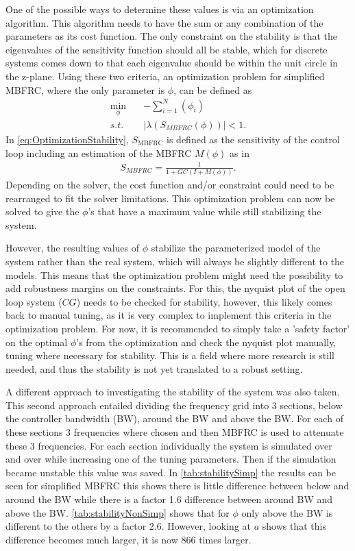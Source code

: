 \documentclass[journal]{IEEEtran}
\begin{document}
One of the possible ways to determine these values is via an optimization algorithm. This algorithm needs to have the sum or any combination of the parameters as its cost function. The only constraint on the stability is that the eigenvalues of the sensitivity function should all be stable, which for discrete systems comes down to that each eigenvalue should be within the unit circle in the z-plane. Using these two criteria, an optimization problem for simplified MBFRC, where the only parameter is $\phi$, can be defined as
\begin{subequations}
\begin{align}\label{eq:OptimizationStability}
    \min_{\phi} \quad & -\sum_{i=1}^{N}(\phi_i )\\
    s.t. \quad & |\lambda(S_{MBFRC}(\phi))|<1.
\end{align}
\end{subequations}
In \autoref{eq:OptimizationStability}, $S_{\text{MBFRC}}$ is defined as the sensitivity of the control loop including an estimation of the MBFRC $M(\phi)$ as in \cite{zwaans_frequency_nodate}
\begin{align}
    S_{MBFRC}=\frac{1}{1+GC(I+M(\phi))}.
\end{align}
Depending on the solver, the cost function and/or constraint could need to be rearranged to fit the solver limitations. This optimization problem can now be solved to give the $\phi$'s that have a maximum value while still stabilizing the system. 

However, the resulting values of $\phi$ stabilize the parameterized model of the system rather than the real system, which will always be slightly different to the models. This means that the optimization problem might need the possibility to add robustness margins on the constraints. For this, the nyquist plot of the open loop system ($CG$) needs to be checked for stability, however, this likely comes back to manual tuning, as it is very complex to implement this criteria in the optimization problem. For now, it is recommended to simply take a 'safety factor' on the optimal $\phi$'s from the optimization and check the nyquist plot manually, tuning where necessary for stability. This is a field where more research is still needed, and thus the stability is not yet translated to a robust setting.

A different approach to investigating the stability of the system was also taken. This second approach entailed dividing the frequency grid into 3 sections, below the controller bandwidth (BW), around the BW and above the BW. For each of these sections 3 frequencies where chosen and then MBFRC is used to attenuate these 3 frequencies. For each section individually the system is simulated over and over while increasing one of the tuning parameters. Then if the simulation became unstable this value was saved. In \autoref{tab:stabilitySimp} the results can be seen for simplified MBFRC this shows there is little difference between below and around the BW while there is a factor 1.6 difference between around BW and above the BW. \autoref{tab:stabilityNonSimp} shows that for $\phi$ only above the BW is different to the others by a factor 2.6. However, looking at $a$ shows that this difference becomes much larger, it is now 866 times larger.
\end{document}
